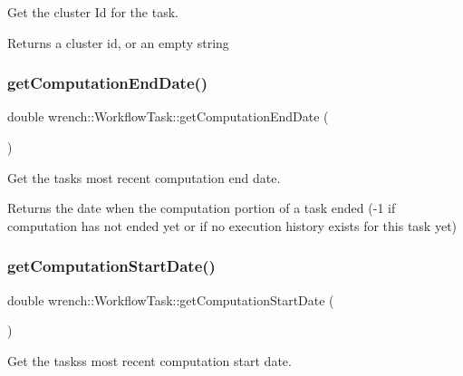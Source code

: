 Get the cluster Id for the task. 

\begin{DoxyReturn}{Returns}
a cluster id, or an empty string 
\end{DoxyReturn}
\mbox{\label{classwrench_1_1_workflow_task_aa02796c5c85aa9fb9a1467eb06506a59}} 
\subsubsection{\texorpdfstring{get\+Computation\+End\+Date()}{getComputationEndDate()}}
{\footnotesize\ttfamily double wrench\+::\+Workflow\+Task\+::get\+Computation\+End\+Date (\begin{DoxyParamCaption}{ }\end{DoxyParamCaption})}



Get the task\textquotesingle{}s most recent computation end date. 

\begin{DoxyReturn}{Returns}
the date when the computation portion of a task ended (-\/1 if computation has not ended yet or if no execution history exists for this task yet) 
\end{DoxyReturn}
\mbox{\label{classwrench_1_1_workflow_task_ab2caf3128cc4c396a1323ac74081fe0f}} 
\subsubsection{\texorpdfstring{get\+Computation\+Start\+Date()}{getComputationStartDate()}}
{\footnotesize\ttfamily double wrench\+::\+Workflow\+Task\+::get\+Computation\+Start\+Date (\begin{DoxyParamCaption}{ }\end{DoxyParamCaption})}



Get the tasks\textquotesingle{}s most recent computation start date. 

